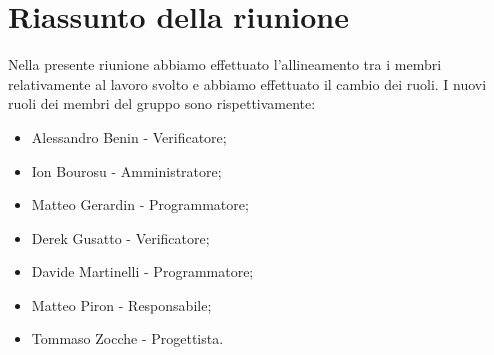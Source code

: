 \section{Riassunto della riunione}
Nella presente riunione abbiamo effettuato l'allineamento tra i membri relativamente al lavoro svolto e abbiamo effettuato il cambio dei ruoli. I nuovi ruoli dei membri del gruppo sono rispettivamente:
\begin{itemize}
    \item Alessandro Benin - Verificatore;
    \item Ion Bourosu - Amministratore;
    \item Matteo Gerardin - Programmatore;
    \item Derek Gusatto - Verificatore;
    \item Davide Martinelli - Programmatore;
    \item Matteo Piron - Responsabile;
    \item Tommaso Zocche - Progettista.
\end{itemize}